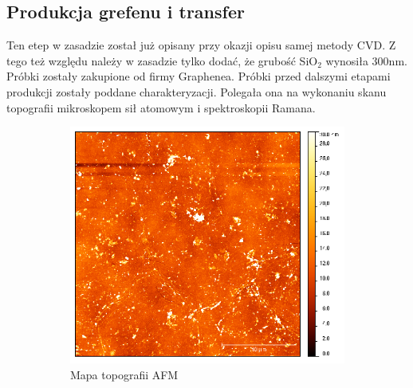 \subsection{Produkcja grefenu i transfer}
Ten etep w zasadzie został już opisany przy okazji opisu samej metody CVD. Z tego też względu należy w zasadzie tylko
dodać, że grubość SiO$_2$ wynosiła 300nm. Próbki zostały zakupione od firmy Graphenea. Próbki przed dalszymi
etapami produkcji zostały poddane charakteryzacji. Polegała ona na wykonaniu skanu topografii mikroskopem sił atomowym
i spektroskopii Ramana.



\begin{figure}[ht]
        \centering
        \begin{subfigure}[b]{0.48\textwidth}
                \centering
                \includegraphics[width=\textwidth]{./Rozdzial_3/obrazki/AFMCVD}
                \caption{Mapa topografii AFM}
                \label{fig:AFMCVD}
        \end{subfigure}%
        ~ %
        \begin{subfigure}[b]{0.48\textwidth}
                \centering

\end{subfigure}
\end{figure}

